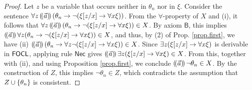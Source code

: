 \documentclass{article}
\newtheorem{lemma}{Lemma}
\begin{document}
\begin{proof}
Let $z$ be a variable that occurs neither in $\theta_n$ nor in $\xi$. Consider the sentence $\forall z\, (\!( \vec{a} )\!)\,(\theta_n \to \neg(\xi[z/x] \to \forall x \xi))$. From the $\forall$-property of $X$ and (i), it follows that $\forall z\, (\!( \vec{a} )\!)\,(\theta_n \to \neg(\xi[z/x] \to \forall x \xi)) \in X$. By axiom $\mathsf{B}$, this implies $(\!( \vec{a} )\!)\, \forall z (\theta_n \to \neg(\xi[z/x] \to \forall x \xi)) \in X$, and thus, by (2) of Prop. \ref{prop.first}, we have (ii) $(\!( \vec{a} )\!)\,(\theta_n \to \forall z \neg(\xi[z/x] \to \forall x \xi)) \in X$. Since $\exists z (\xi[z/x] \to \forall x \xi)$ is derivable in $\mathsf{FOCL}$, applying rule $\mathsf{Nec}$ gives $(\!( \vec{a} )\!)\, \exists z (\xi[z/x] \to \forall x \xi) \in X$. From this, together with (ii), and using Proposition \ref{prop.first}, %
we conclude $(\!( \vec{a} )\!)\, \neg \theta_n \in X$. By the construction of $Z$, this implies $\neg \theta_n \in Z$, which contradicts the assumption that $Z \cup \{\theta_n\}$ is consistent.
\end{proof}








    
\end{document}
